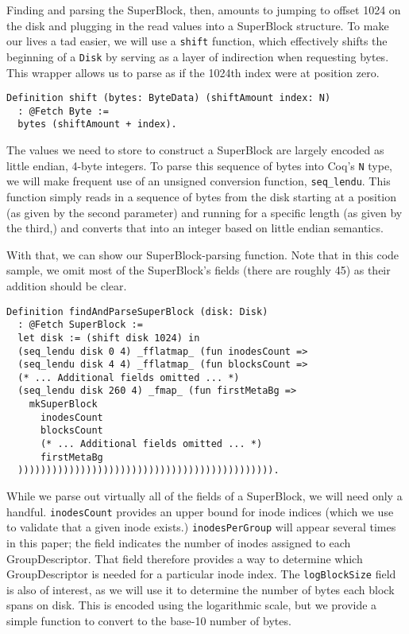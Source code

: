 \documentclass[nocopyrightspace]{sigplanconf}
\begin{document}
Finding and parsing the SuperBlock, then, amounts to jumping to offset 1024 on
the disk and plugging in the read values into a SuperBlock structure. To make
our lives a tad easier, we will use a {\tt shift} function, which effectively
shifts the beginning of a {\tt Disk} by serving as a layer of indirection when
requesting bytes. This wrapper allows us to parse as if the 1024th index were
at position zero.

\begin{lstlisting}
Definition shift (bytes: ByteData) (shiftAmount index: N)
  : @Fetch Byte :=
  bytes (shiftAmount + index).
\end{lstlisting}

The values we need to store to construct a SuperBlock are largely encoded as
little endian, 4-byte integers. To parse this sequence of bytes into Coq's
{\tt N} type, we will make frequent use of an unsigned conversion function,
{\tt seq\_lendu}. This function simply reads in a sequence of bytes from the
disk starting at a position (as given by the second parameter) and running for
a specific length (as given by the third,) and converts that into an integer
based on little endian semantics. 

With that, we can show our SuperBlock-parsing function. Note that in this code
sample, we omit most of the SuperBlock's fields (there are roughly 45) as
their addition should be clear.

\begin{lstlisting}
Definition findAndParseSuperBlock (disk: Disk)
  : @Fetch SuperBlock :=
  let disk := (shift disk 1024) in
  (seq_lendu disk 0 4) _fflatmap_ (fun inodesCount =>
  (seq_lendu disk 4 4) _fflatmap_ (fun blocksCount =>
  (* ... Additional fields omitted ... *)
  (seq_lendu disk 260 4) _fmap_ (fun firstMetaBg =>
    mkSuperBlock
      inodesCount
      blocksCount
      (* ... Additional fields omitted ... *)
      firstMetaBg
  ))))))))))))))))))))))))))))))))))))))))))))).
\end{lstlisting}

While we parse out virtually all of the fields of a SuperBlock, we will need
only a handful. {\tt inodesCount} provides an upper bound for inode indices
(which we use to validate that a given inode exists.) {\tt inodesPerGroup}
will appear several times in this paper; the field indicates the number of
inodes assigned to each GroupDescriptor. That field therefore provides a way
to determine which GroupDescriptor is needed for a particular inode index. The
{\tt logBlockSize} field is also of interest, as we will use it to determine
the number of bytes each block spans on disk. This is encoded using the
logarithmic scale, but we provide a simple function to convert to the base-10
number of bytes.
\end{document}
